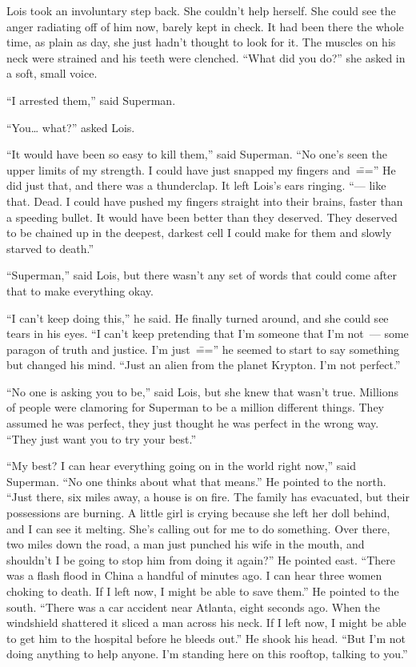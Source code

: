 Lois took an involuntary step back. She couldn't help herself. She could
see the anger radiating off of him now, barely kept in check. It had
been there the whole time, as plain as day, she just hadn't thought to
look for it. The muscles on his neck were strained and his teeth were
clenched. ``What did you do?'' she asked in a soft, small voice.

``I arrested them,'' said Superman.

``You\ldots{} what?'' asked Lois.

``It would have been so easy to kill them,'' said Superman. ``No one's
seen the upper limits of my strength. I could have just snapped my
fingers and~\==='' He did just that, and there was a thunderclap. It left
Lois's ears ringing. ``--- like that. Dead. I could have pushed my
fingers straight into their brains, faster than a speeding bullet. It
would have been better than they deserved. They deserved to be chained
up in the deepest, darkest cell I could make for them and slowly starved
to death.''

``Superman,'' said Lois, but there wasn't any set of words that could
come after that to make everything okay.

``I can't keep doing this,'' he said. He finally turned around, and she
could see tears in his eyes. ``I can't keep pretending that I'm someone
that I'm not~--- some paragon of truth and justice. I'm just~\==='' he
seemed to start to say something but changed his mind. ``Just an alien
from the planet Krypton. I'm not perfect.''

``No one is asking you to be,'' said Lois, but she knew that wasn't
true. Millions of people were clamoring for Superman to be a million
different things. They assumed he was perfect, they just thought he was
perfect in the wrong way. ``They just want you to try your best.''

``My best? I can hear everything going on in the world right now,'' said
Superman. ``No one thinks about what that means.'' He pointed to the
north. ``Just there, six miles away, a house is on fire. The family has
evacuated, but their possessions are burning. A little girl is crying
because she left her doll behind, and I can see it melting. She's
calling out for me to do something. Over there, two miles down the road,
a man just punched his wife in the mouth, and shouldn't I be going to
stop him from doing it again?'' He pointed east. ``There was a flash
flood in China a handful of minutes ago. I can hear three women choking
to death. If I left now, I might be able to save them.'' He pointed to
the south. ``There was a car accident near Atlanta, eight seconds ago.
When the windshield shattered it sliced a man across his neck. If I left
now, I might be able to get him to the hospital before he bleeds out.''
He shook his head. ``But I'm not doing anything to help anyone. I'm
standing here on this rooftop, talking to you.''

